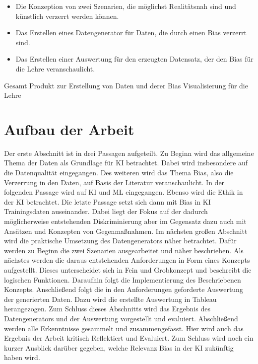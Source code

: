 \begin{onehalfspace}
        \begin{itemize}
            \item Die Konzeption von zwei Szenarien, die möglichst Realitätsnah sind und künstlich verzerrt werden können.
            \item Das Erstellen eines Datengenerator für Daten, die durch einen Bias verzerrt sind.
            \item Das Erstellen einer Auswertung für den erzeugten Datensatz, der den Bias für die Lehre veranschaulicht.
        \end{itemize}

        Gesamt Produkt zur Erstellung von Daten und derer Bias Visualisierung für die Lehre 
        \\

        \newpage
        \section{Aufbau der Arbeit}
        \label{subsec:aufbau der arbeit}
        Der erste Abschnitt ist in drei Passagen aufgeteilt. Zu Beginn wird das allgemeine Thema der Daten als Grundlage für \ac*{KI} betrachtet. Dabei wird insbesondere auf die Datenqualität eingegangen. Des weiteren wird das Thema Bias, also die Verzerrung in den Daten, auf Basis der Literatur veranschaulicht. In der folgenden Passage wird auf \ac*{KI} und \ac{ML} eingegangen. Ebenso wird die Ethik in der \ac*{KI} betrachtet. Die letzte Passage setzt sich dann mit Bias in \ac*{KI} Trainingsdaten auseinander. Dabei liegt der Fokus auf der dadurch möglicherweise entstehenden Diskriminierung aber im Gegensatz dazu auch mit Ansätzen und Konzepten von Gegenmaßnahmen.
        Im nächsten großen Abschnitt wird die praktische Umsetzung des Datengenerators näher betrachtet. Dafür werden zu Beginn die zwei Szenarien ausgearbeitet und näher beschrieben. Als nächstes werden die daraus entstehenden Anforderungen in Form eines Konzepts aufgestellt. Dieses unterscheidet sich in Fein und Grobkonzept und beschreibt die logischen Funktionen. Daraufhin folgt die Implementierung des Beschriebenen Konzepts. Anschließend folgt die in den Anforderungen geforderte Auswertung der generierten Daten. Dazu wird die erstellte Auswertung in Tableau herangezogen. Zum Schluss dieses Abschnitts wird das Ergebnis des Datengenerators und der Auswertung vorgestellt und evaluiert.
        Abschließend werden alle Erkenntnisse gesammelt und zusammengefasst. Hier wird auch das Ergebnis der Arbeit kritisch Reflektiert und Evaluiert. Zum Schluss wird noch ein kurzer Ausblick darüber gegeben, welche Relevanz Bias in der \ac*{KI} zukünftig haben wird. 
        
        \newpage
    \end{onehalfspace}